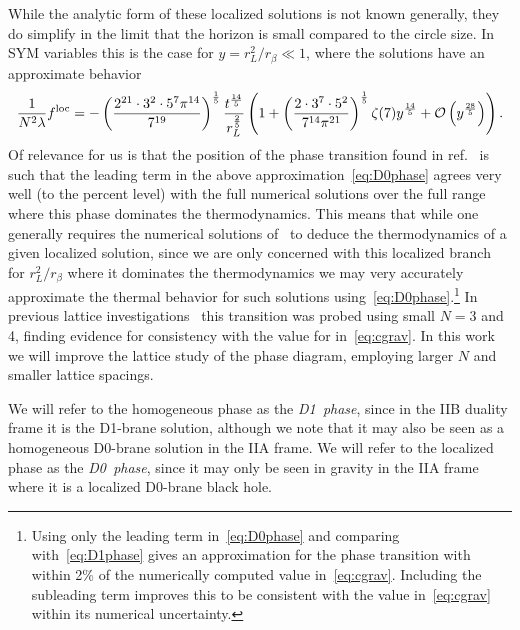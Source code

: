 While the analytic form of these localized solutions is not known generally, they do simplify in the limit that the horizon is small compared to the circle size.
In SYM variables this is the case for $y = r_L^2 / r_{\beta} \ll 1$, where the solutions have an approximate behavior~\cite{Harmark:2004ws}
\begin{equation}
  \label{eq:D0phase}
    \frac{1}{N^2 \lambda} f^{\text{loc}} = -\left(\frac{2^{21}\cdot 3^2 \cdot 5^7 \pi^{14}}{7^{19}}\right)^{\frac{1}{5}} \frac{t^{\frac{14}{5}}}{r_L^{\frac{2}{5}}} \left(1 + \left(\frac{2 \cdot 3^7 \cdot 5^2}{7^{14} \pi^{21}}\right)^{\frac{1}{5}} \zeta(7) y^{\frac{14}{5}} + \mathcal O\left(y^{\frac{28}{5}}\right)\right).
\end{equation}
Of relevance for us is that the position of the phase transition found in ref.~\cite{Dias:2017uyv} is such that the leading term in the above approximation~\eqref{eq:D0phase} agrees very well (to the percent level) with the full numerical solutions over the full range where this phase dominates the thermodynamics.
This means that while one generally requires the numerical solutions of~\cite{Dias:2017uyv} to deduce the thermodynamics of a given localized solution, since we are only concerned with this localized branch for $r_L^2 / r_{\beta}$ where it dominates the thermodynamics we may very accurately approximate the thermal behavior for such solutions using~\eqref{eq:D0phase}.\footnote{Using only the leading term in~\eqref{eq:D0phase} and comparing with~\eqref{eq:D1phase} gives an approximation for the phase transition with \cgrav within 2\% of the numerically computed value in~\eqref{eq:cgrav}.  Including the subleading term improves this to be consistent with the value in~\eqref{eq:cgrav} within its numerical uncertainty.}
In previous lattice investigations~\cite{Catterall:2010fx} this transition was probed using small $N = 3$ and 4, finding evidence for consistency with the value for \cgrav in~\eqref{eq:cgrav}.
In this work we will improve the lattice study of the phase diagram, employing larger $N$ and smaller lattice spacings.

We will refer to the homogeneous phase as the \emph{D1~phase}, since in the IIB duality frame it is the D1-brane solution, although we note that it may also be seen as a homogeneous D0-brane solution in the IIA frame.
We will refer to the localized phase as the \emph{D0~phase}, since it may only be seen in gravity in the IIA frame where it is a localized D0-brane black hole.

